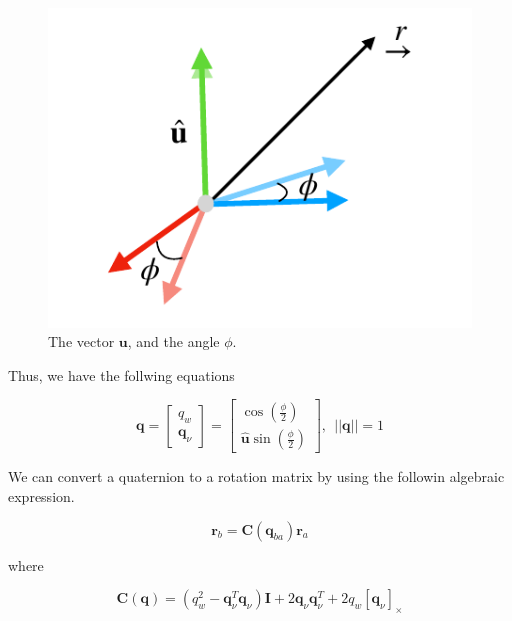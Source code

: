 \begin{figure}[!htb]
\begin{center}
\includegraphics[scale=0.290]{img/coordinate_transforms/coordinate_rotations_3.jpeg}
\end{center}
\caption{The vector $\mathbf{u}$, and the angle $\phi$.}
\label{coordinate_rotations_3}
\end{figure}

Thus, we have the follwing equations

\begin{equation}
\mathbf{q} = 
\begin{bmatrix}
q_w \\
\mathbf{q}_{\nu}
\end{bmatrix} = 
\begin{bmatrix}
\cos(\frac{\phi}{2}) \\
\hat{\mathbf{u}}\sin(\frac{\phi}{2})
\end{bmatrix}, ~~ ||\mathbf{q}|| = 1
\end{equation}

We can convert a quaternion
to a rotation matrix by using the followin algebraic expression. 


\begin{equation}
\mathbf{r}_b = \mathbf{C}(\mathbf{q}_{ba})\mathbf{r}_a
\end{equation}

where 

\begin{equation}
\mathbf{C}(\mathbf{q}) = (q_{w}^2 - \mathbf{q}_{\nu}^T\mathbf{q}_{\nu})\mathbf{I} + 2\mathbf{q}_{\nu}\mathbf{q}_{\nu}^T + 2q_w[\mathbf{q}_{\nu}]_{\times}
\end{equation}

